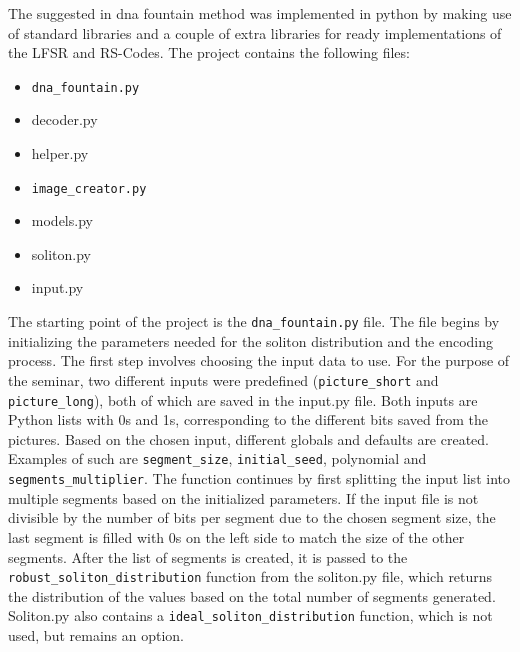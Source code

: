 \documentclass[12pt]%
{article}
\begin{document}
The suggested in \cite{erlich2017dna} dna fountain method was implemented in python by making use of standard libraries and a couple of extra libraries for ready implementations of the LFSR and RS-Codes. The project contains the following files:
\begin{itemize}
\item \texttt{dna\_fountain.py}
\item decoder.py
\item helper.py
\item \texttt{image\_creator.py}
\item models.py
\item soliton.py
\item input.py
\end{itemize}

The starting point of the project is the \texttt{dna\_fountain.py} file. The file begins by initializing the parameters needed for the soliton distribution and the encoding process. The first step involves choosing the input data to use. For the purpose of the seminar, two different inputs were predefined (\texttt{picture\_short} and \texttt{picture\_long}), both of which are saved in the input.py file. Both inputs are Python lists with 0s and 1s, corresponding to the different bits saved from the pictures. Based on the chosen input, different globals and defaults are created. Examples of such are \texttt{segment\_size}, \texttt{initial\_seed}, polynomial and \texttt{segments\_multiplier}. The function continues by first splitting the input list into multiple segments based on the initialized parameters. If the input file is not divisible by the number of bits per segment due to the chosen segment size, the last segment is filled with 0s on the left side to match the size of the other segments. After the list of segments is created, it is passed to the \texttt{robust\_soliton\_distribution} function from the soliton.py file, which returns the distribution of the values based on the total number of segments generated. Soliton.py also contains a \texttt{ideal\_soliton\_distribution} function, which is not used, but remains an option. \\
\end{document}
